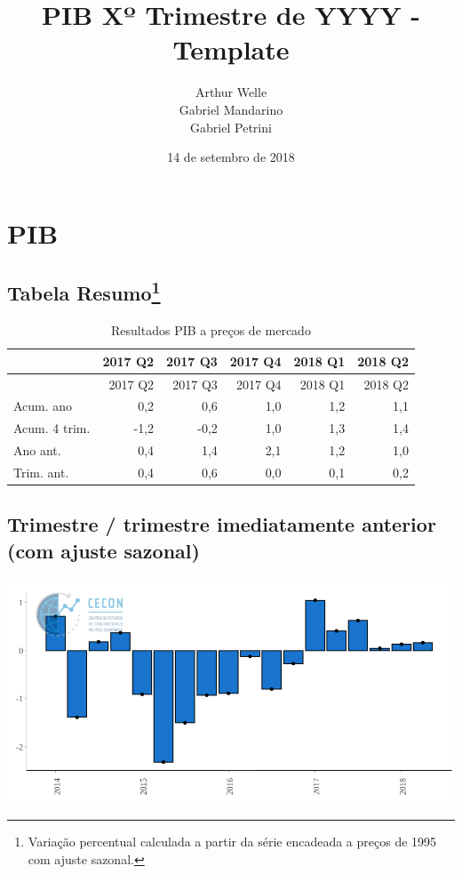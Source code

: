 \documentclass[11pt,portuguese,]{article}
\title{PIB Xº Trimestre de YYYY - Template}
\author{Arthur Welle \\ Gabriel Mandarino \\ Gabriel Petrini}
\date{14 de setembro de 2018}
\let\rmarkdownfootnote\footnote%
\def\footnote{\protect\rmarkdownfootnote}
\begin{document}
\maketitle

\section{PIB}\label{pib}

\subsection[Tabela Resumo]{\texorpdfstring{Tabela Resumo\footnote{Variação
  percentual calculada a partir da série encadeada a preços de 1995 com
  ajuste sazonal.}}{Tabela Resumo}}\label{tabela-resumo1}

\begin{longtable}[]{@{}lrrrrr@{}}
\caption{Resultados PIB a preços de mercado}\tabularnewline
\toprule
& 2017 Q2 & 2017 Q3 & 2017 Q4 & 2018 Q1 & 2018 Q2\tabularnewline
\midrule
\endfirsthead
\toprule
& 2017 Q2 & 2017 Q3 & 2017 Q4 & 2018 Q1 & 2018 Q2\tabularnewline
\midrule
\endhead
Acum. ano & 0,2 & 0,6 & 1,0 & 1,2 & 1,1\tabularnewline
Acum. 4 trim. & -1,2 & -0,2 & 1,0 & 1,3 & 1,4\tabularnewline
Ano ant. & 0,4 & 1,4 & 2,1 & 1,2 & 1,0\tabularnewline
Trim. ant. & 0,4 & 0,6 & 0,0 & 0,1 & 0,2\tabularnewline
\bottomrule
\end{longtable}

\subsection{Trimestre / trimestre imediatamente anterior (com ajuste
sazonal)}\label{trimestre-trimestre-imediatamente-anterior-com-ajuste-sazonal}

\begin{center}\includegraphics[width=1\linewidth]{Grafico_PIB} \end{center}
\end{document}
